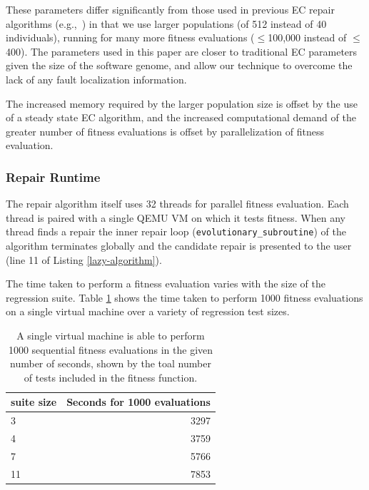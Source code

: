 \documentclass{sigcomm-alternate}
\begin{document}
These parameters differ significantly from those used in previous EC
repair algorithms
(e.g.,~\cite{forrest2009genetic,legoues2011systematicstudy,le2012representations})
in that we
use larger populations (of 512 instead of 40 individuals), running for
many more fitness evaluations ($\leq$100,000 instead of $\leq$400).  The
parameters used in this paper are closer to traditional EC
parameters given the size of the software genome, and allow our
technique to overcome the lack of any fault localization information.

The increased memory required by the larger population size is offset
by the use of a steady state EC algorithm, and the increased
computational demand of the greater number of fitness evaluations is
offset by parallelization of fitness evaluation.

\subsubsection{Repair Runtime}
\label{sec-4-1-2}
The repair algorithm itself uses 32 threads for parallel fitness
evaluation.  Each thread is paired with a single QEMU VM on which it
tests fitness.  When any thread finds a repair the inner repair loop
(\texttt{evolutionary\_subroutine}) of the algorithm terminates globally and
the candidate repair is presented to the user (line 11 of Listing
\ref{lazy-algorithm}).

The time taken to perform a fitness evaluation varies with the size of
the regression suite.  Table \ref{test-speed} shows the time taken to
perform 1000 fitness evaluations on a single virtual machine over a
variety of regression test sizes.

\begin{table}[htb]
\centering
\begin{tabular}{l|r}
suite size & Seconds for 1000 evaluations \\
\hline
3          & 3297                         \\
4          & 3759                         \\
7          & 5766                         \\
11         & 7853                         \\
\end{tabular}
\caption{\label{test-speed}A single virtual machine is able to perform
  1000 sequential fitness evaluations in the given number of seconds,
  shown by the toal number of tests included in the fitness
  function.}
\end{table}
\end{document}
